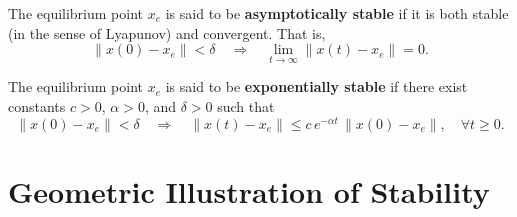 \begin{definition}
The equilibrium point $x_e$ is said to be \textbf{asymptotically stable} if it is both stable (in the sense of Lyapunov) and convergent. That is,
\[
    \|x(0) - x_e\| < \delta \quad \Rightarrow \quad 
    \lim_{t \to \infty} \|x(t) - x_e\| = 0.
\]
\end{definition}

\begin{definition}
The equilibrium point $x_e$ is said to be \textbf{exponentially stable} if there exist constants $c > 0$, $\alpha > 0$, and $\delta > 0$ such that
\[
    \|x(0) - x_e\| < \delta \quad \Rightarrow \quad 
    \|x(t) - x_e\| \leq c \, e^{-\alpha t} \, \|x(0) - x_e\|, \quad \forall t \geq 0.
\]
\end{definition}

\section{Geometric Illustration of Stability}

